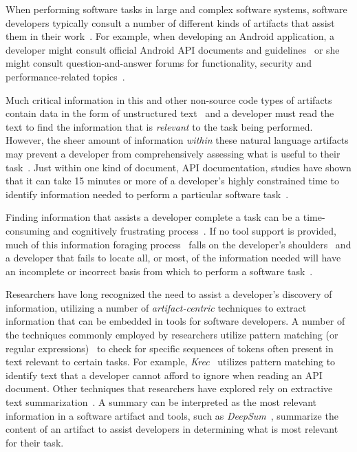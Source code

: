 

When performing software tasks in large and complex software systems, software developers typically consult a number of different kinds of artifacts that assist them in their work~\cite{Starke2009, Meyer2017}. For example, 
when developing an Android application, a developer might consult official Android API documents and guidelines~\cite{robillard2011field, umarji2008archetypal} or she might consult question-and-answer forums for functionality, security and performance-related topics~\cite{parnin2012, silva2019}.




Much critical information in this and other non-source code types of artifacts 
contain data in the form of unstructured text~\cite{Bavota2016} and 
a developer must read the text to find the information that is \textit{relevant} to the task being performed.
However, the sheer amount of information \textit{within} these natural language artifacts may prevent a developer from comprehensively assessing what is useful to their task~\cite{Murphy2005}.  Just within one kind of document, API
documentation, studies have shown that it can take 15 minutes or more
of a developer's highly constrained time to identify 
information needed to perform a particular software task~\cite{endrikat2014, Meyer2017}.


Finding information that assists a developer complete a task can be a time-consuming
and cognitively frustrating process~\cite{Begel2008,
robillard2011field}.
If no tool support is provided, much of this information foraging process~\cite{Pirolli1999, Just1980} falls on the developer's shoulders~\cite{gonccalves2011, Ko2006a, Bystrom1995} and a developer that fails to locate all, or most, of the information needed
 will have an incomplete or incorrect basis from which to perform a software task~\cite{Murphy2005}.





Researchers have long recognized the need to assist a developer's discovery of information,
utilizing a number of
\textit{artifact-centric} techniques
to extract
information that can be embedded in
tools for software developers. 
A number of the techniques commonly employed by researchers utilize pattern matching (or regular expressions)~\cite{Maalej2013, Bavota2014, Chaparro2017}   
to check for specific sequences of tokens often present in text relevant to certain tasks. For example, \textit{Krec}~\cite{Robillard2015} utilizes pattern matching to identify text that a developer cannot afford to ignore when reading an API document.
Other techniques that researchers have explored rely on extractive text summarization~\cite{Rastkar2010, Lotufo2012, Murray2008}. 
A summary can be interpreted as the most relevant information in a software artifact 
and tools, such as \textit{DeepSum}~\cite{Li2018}, summarize the content of an artifact 
to assist developers in determining what is most relevant for their task.






